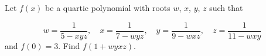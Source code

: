 Let $f(x)$ be a quartic polynomial with roots $w$, $x$, $y$, $z$ such that

$$w=\dfrac{1}{5-xyz},\quad x=\dfrac{1}{7-wyz},\quad y=\dfrac{1}{9-wxz},\quad z=\dfrac{1}{11-wxy}$$and $f(0)=3$. Find $f(1+wyxz)$.
